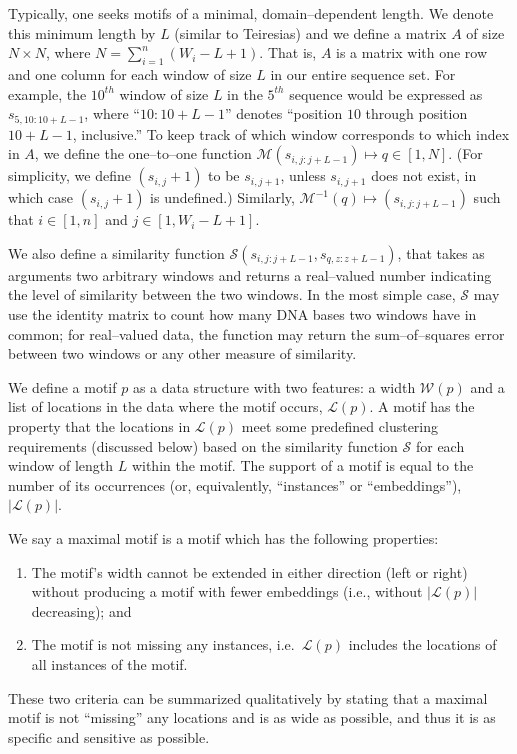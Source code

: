     Typically, one seeks motifs
    of a minimal, domain--dependent length.
    We denote this minimum length by $L$
    (similar to Teiresias)
    and we define a matrix $A$ of size
    $N\times N$, where $N = \sum_{i=1}^{n}(W_i-L+1)$.
    That is, $A$ is a matrix with one row and one column for each
    window of size $L$ in our entire sequence set.
    For example, the $10^{th}$ window of size $L$ in the $5^{th}$
    sequence would be expressed as $s_{5,10:10+L-1}$,
    where ``$10:10+L-1$'' denotes ``position $10$
    through position $10+L-1$, inclusive.''  To keep
    track of which window corresponds to which index
    in $A$, we define the one--to--one function
    $\mathscr{M}(s_{i,j:j+L-1})\mapsto q \in [1,N]$.
    (For simplicity, we define
    $(s_{i,j}+1)$ to be $s_{i,j+1}$, unless $s_{i,j+1}$
    does not exist, in which case $(s_{i,j}+1)$
    is undefined.)  Similarly, $\mathscr{M}^{-1}(q)
    \mapsto (s_{i,j:j+L-1})$ such that $i\in[1,n]$
    and $j \in [1,W_i-L+1]$.

    We also define a similarity function
    $\mathscr{S}(s_{i,j:j+L-1}, s_{q,z:z+L-1})$,
    that takes as arguments two
    arbitrary windows and returns a real--valued number
    indicating the level of similarity between the two
    windows.  In the most simple case, $\mathscr{S}$
    may use the identity matrix to count how
    many DNA bases two windows have in common;
    for real--valued data, the function may return
    the sum--of--squares error between two windows
    or any other measure of similarity.


    We define a motif $p$ as a data structure
    with two features: a width $\mathscr{W}(p)$
    and a list of locations in the data where the
    motif occurs, $\mathscr{L}(p)$.  A motif has the
    property that the locations in $\mathscr{L}(p)$
    meet some predefined clustering requirements
    (discussed below) based on the similarity function
    $\mathscr{S}$ for each window of length $L$ within
    the motif.  The support of a motif is equal to
    the number of its occurrences (or, equivalently, ``instances'' or ``embeddings''),
    $\vert \mathscr{L}(p) \vert$.

    We say a maximal motif is a motif which has the following properties:
        \begin{enumerate}
        \item   The motif's width cannot be extended in
            either direction (left or right)
            without producing a motif with
            fewer embeddings (i.e., without
            $\vert \mathscr{L}(p) \vert$
            decreasing); and

        \item   The motif is not missing any instances,
            i.e.\ $\mathscr{L}(p)$ includes the locations
            of all instances of the motif.

        \end{enumerate}
    These two criteria can be summarized qualitatively by stating that a maximal
    motif is not ``missing'' any locations and is as wide as possible, and
    thus it is as specific and sensitive as possible.

